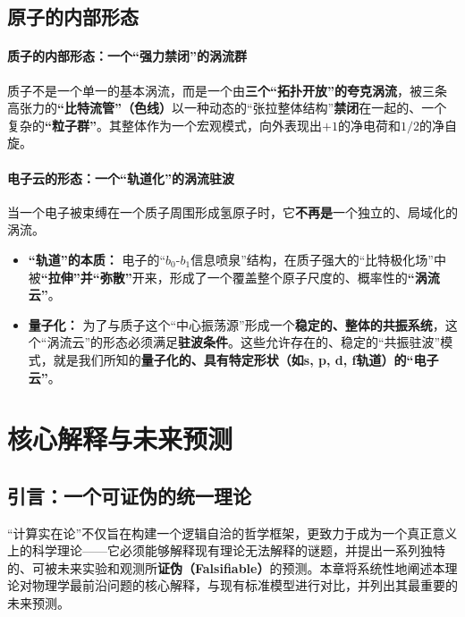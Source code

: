 \documentclass[11pt, a4paper]{article}
\begin{document}
\subsection{原子的内部形态}

\paragraph{质子的内部形态：一个“强力禁闭”的涡流群}

质子不是一个单一的基本涡流，而是一个由\textbf{三个“拓扑开放”的夸克涡流}，被三条高张力的\textbf{“比特流管”（色线）}以一种动态的“张拉整体结构”\textbf{禁闭}在一起的、一个复杂的\textbf{“粒子群”}。其整体作为一个宏观模式，向外表现出$+1$的净电荷和$1/2$的净自旋。

\paragraph{电子云的形态：一个“轨道化”的涡流驻波}

当一个电子被束缚在一个质子周围形成氢原子时，它\textbf{不再是}一个独立的、局域化的涡流。

\begin{itemize}
    \item \textbf{“轨道”的本质：} 电子的“$b_0$-$b_1$信息喷泉”结构，在质子强大的“比特极化场”中被\textbf{“拉伸”并“弥散”}开来，形成了一个覆盖整个原子尺度的、概率性的\textbf{“涡流云”}。
    \item \textbf{量子化：} 为了与质子这个“中心振荡源”形成一个\textbf{稳定的、整体的共振系统}，这个“涡流云”的形态必须满足\textbf{驻波条件}。这些允许存在的、稳定的“共振驻波”模式，就是我们所知的\textbf{量子化的、具有特定形状（如s, p, d, f轨道）的“电子云”}。
\end{itemize}


\section{核心解释与未来预测}

\subsection{引言：一个可证伪的统一理论}

“计算实在论”不仅旨在构建一个逻辑自洽的哲学框架，更致力于成为一个真正意义上的科学理论——它必须能够解释现有理论无法解释的谜题，并提出一系列独特的、可被未来实验和观测所\textbf{证伪（Falsifiable）}的预测。本章将系统性地阐述本理论对物理学最前沿问题的核心解释，与现有标准模型进行对比，并列出其最重要的未来预测。
\end{document}
